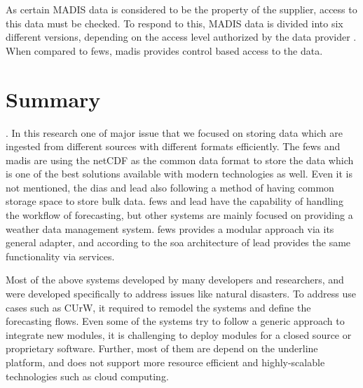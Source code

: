 As certain MADIS data is considered to be the property of the supplier, access to this data must be checked. To respond to this, MADIS data is divided into six different versions, depending on the access level authorized by the data provider \cite{Macdermaid2005ArchitectureP2.39}. When compared to \acrshort{fews}, \acrshort{madis} provides control based access to the data.



\section{Summary}
\label{se:lit_summary}
. In this research one of major issue that we focused on storing data which are ingested from different sources with different formats efficiently. The \acrshort{fews} and \acrshort{madis} are using the \acrshort{netCDF} as the common data format to store the data which is one of the best solutions available with modern technologies as well. Even it is not mentioned, the \acrshort{dias} and \acrshort{lead} also following a method of having common storage space to store bulk data.
\acrshort{fews} and \acrshort{lead} have the capability of handling the workflow of forecasting, but other systems are mainly focused on providing a weather data management system.
\acrshort{fews} provides a modular approach via its general adapter, and according to the \acrshort{soa} architecture of \acrshort{lead} provides the same functionality via services.

Most of the above systems developed by many developers and researchers, and were developed specifically to address issues like natural disasters. To address use cases such as CUrW, it required to remodel the systems  and define the forecasting flows. Even some of the systems try to follow a generic approach to integrate new modules, it is challenging to deploy modules for a closed source or proprietary software. Further, most of them are depend on the underline platform, and does not support more resource efficient and highly-scalable technologies such as cloud computing.

